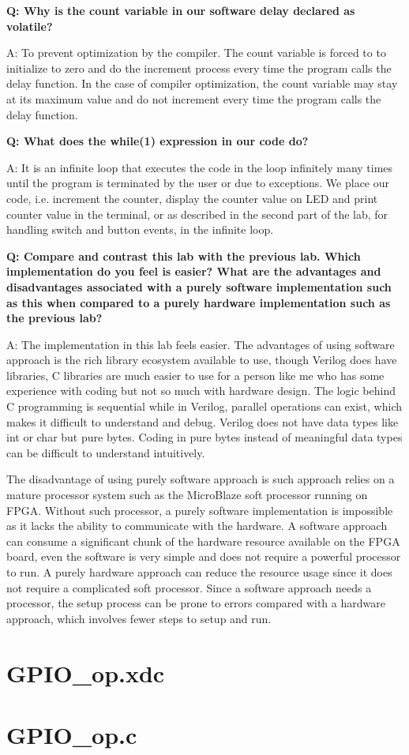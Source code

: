 \documentclass[11pt,letterpaper,titlepage]{article}
\begin{document}
\textbf{Q: Why is the count variable in our software delay declared as volatile?}

A: To prevent optimization by the compiler. The count variable is forced to to initialize to zero and do the increment process every time the program calls the delay function. In the case of compiler optimization, the count variable may stay at its maximum value and do not increment every time the program calls the delay function.

\textbf{Q: What does the while(1) expression in our code do?}

A: It is an infinite loop that executes the code in the loop infinitely many times until the program is terminated by the user or due to exceptions. We place our code, i.e. increment the counter, display the counter value on LED and print counter value in the terminal, or as described in the second part of the lab, for handling switch and button events, in the infinite loop.

\textbf{Q: Compare and contrast this lab with the previous lab. Which implementation do you feel is easier? What are the advantages and disadvantages associated with a purely software implementation such as this when compared to a purely hardware implementation such as the previous lab?}

A: The implementation in this lab feels easier. The advantages of using software approach is the rich library ecosystem available to use, though Verilog does have libraries, C libraries are much easier to use for a person like me who has some experience with coding but not so much with hardware design. The logic behind C programming is sequential while in Verilog, parallel operations can exist, which makes it difficult to understand and debug. Verilog does not have data types like int or char but pure bytes. Coding in pure bytes instead of meaningful data types can be difficult to understand intuitively.

The disadvantage of using purely software approach is such approach relies on a mature processor system such as the MicroBlaze soft processor running on FPGA. Without such processor, a purely software implementation is impossible as it lacks the ability to communicate with the hardware. A software approach can consume a significant chunk of the hardware resource available on the FPGA board, even the software is very simple and does not require a powerful processor to run. A purely hardware approach can reduce the resource usage since it does not require a complicated soft processor. Since a software approach needs a processor, the setup process can be prone to errors compared with a hardware approach, which involves fewer steps to setup and run.

\newpage

\begin{appendices}

\section{GPIO\_op.xdc}
\label{appendix:GPIO_xdc}


\section{GPIO\_op.c}
\label{appendix:GPIO_c}


\end{appendices}
\end{document}
